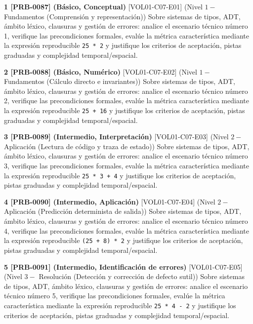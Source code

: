 \documentclass{book}
\begin{document}
\begin{tcolorbox}[title={Ejercicios}, studiumworked, breakable]

\noindent\textbf{1 [PRB-0087] (Básico, Conceptual)}
[VOL01-C07-E01] (Nivel \(1 -\) Fundamentos (Comprensión y representación)) Sobre sistemas de tipos, ADT, ámbito léxico, clausuras y gestión de errores: analice el escenario técnico número 1, verifique las precondiciones formales, evalúe la métrica característica mediante la expresión reproducible \texttt{25 * 2} y justifique los criterios de aceptación, pistas graduadas y complejidad temporal/espacial.

\noindent\textbf{2 [PRB-0088] (Básico, Numérico)}
[VOL01-C07-E02] (Nivel \(1 -\) Fundamentos (Cálculo directo e invariantes)) Sobre sistemas de tipos, ADT, ámbito léxico, clausuras y gestión de errores: analice el escenario técnico número 2, verifique las precondiciones formales, evalúe la métrica característica mediante la expresión reproducible \texttt{25 + 16} y justifique los criterios de aceptación, pistas graduadas y complejidad temporal/espacial.

\noindent\textbf{3 [PRB-0089] (Intermedio, Interpretación)}
[VOL01-C07-E03] (Nivel \(2 -\) Aplicación (Lectura de código y traza de estado)) Sobre sistemas de tipos, ADT, ámbito léxico, clausuras y gestión de errores: analice el escenario técnico número 3, verifique las precondiciones formales, evalúe la métrica característica mediante la expresión reproducible \texttt{25 * 3 + 4} y justifique los criterios de aceptación, pistas graduadas y complejidad temporal/espacial.

\noindent\textbf{4 [PRB-0090] (Intermedio, Aplicación)}
[VOL01-C07-E04] (Nivel \(2 -\) Aplicación (Predicción determinista de salida)) Sobre sistemas de tipos, ADT, ámbito léxico, clausuras y gestión de errores: analice el escenario técnico número 4, verifique las precondiciones formales, evalúe la métrica característica mediante la expresión reproducible \texttt{(25 + 8) * 2} y justifique los criterios de aceptación, pistas graduadas y complejidad temporal/espacial.

\noindent\textbf{5 [PRB-0091] (Intermedio, Identificación de errores)}
[VOL01-C07-E05] (Nivel \(3 -\) Resolución (Detección y corrección de defecto sutil)) Sobre sistemas de tipos, ADT, ámbito léxico, clausuras y gestión de errores: analice el escenario técnico número 5, verifique las precondiciones formales, evalúe la métrica característica mediante la expresión reproducible \texttt{25 * 4 - 2} y justifique los criterios de aceptación, pistas graduadas y complejidad temporal/espacial.


\end{tcolorbox}
\end{document}
